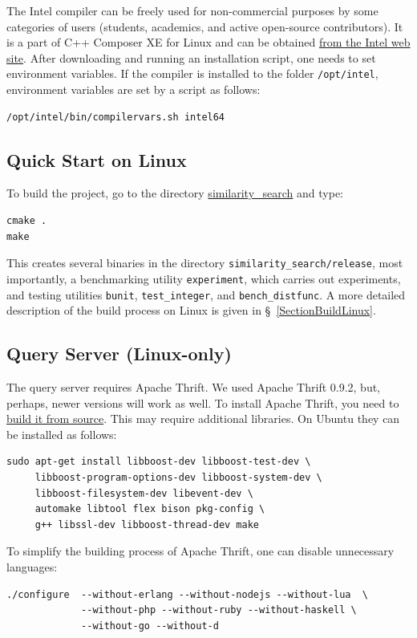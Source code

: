\documentclass[runningheads,a4paper]{llncs}
\newcommand{\replocdir}{https://github.com/searchivarius/nmslib/tree/v1.5/}
\newcommand{\ttt}[1]{\texttt{#1}}
\begin{document}
{The Intel compiler can be freely used for non-commercial purposes by some categories of users (students, academics,
and active open-source contributors).
It is a part of C++ Composer XE for Linux and can 
be obtained \href{http://software.intel.com/en-us/non-commercial-software-development}{from the Intel web site}.
After downloading and running an installation script, one needs to set environment variables.
If the compiler is installed to the folder \ttt{/opt/intel}, environment variables
are set by a script as follows:
\begin{verbatim}
/opt/intel/bin/compilervars.sh intel64
\end{verbatim}



\subsection{Quick Start on Linux}\label{QuickStartLinux}
To build the project, go to the directory \href{\replocdir similarity_search}{similarity\_search} and type:  
\begin{verbatim}
cmake .  
make   
\end{verbatim}
This creates several binaries in the directory \ttt{similarity\_search/release}, 
most importantly, 
a benchmarking utility \ttt{experiment}, which carries out experiments,
and testing utilities \ttt{bunit}, \ttt{test\_integer}, and \ttt{bench\_distfunc}.
A more detailed description of the build process on Linux is given in \S~\ref{SectionBuildLinux}.

\subsection{Query Server (Linux-only)}\label{SectionQueryServer}

The query server requires Apache Thrift. We used Apache Thrift 0.9.2, but, perhaps, newer versions will work as well.  
To install Apache Thrift, you need to \href{https://thrift.apache.org/docs/BuildingFromSource}{build it from source}.
This may require additional libraries. On Ubuntu they can be installed as follows:
\begin{verbatim}
sudo apt-get install libboost-dev libboost-test-dev \ 
     libboost-program-options-dev libboost-system-dev \
     libboost-filesystem-dev libevent-dev \
     automake libtool flex bison pkg-config \
     g++ libssl-dev libboost-thread-dev make
\end{verbatim}
To simplify the building process of Apache Thrift, one can disable unnecessary languages:
\begin{verbatim}
./configure  --without-erlang --without-nodejs --without-lua  \
             --without-php --without-ruby --without-haskell \
             --without-go --without-d 
\end{verbatim}

}
\end{document}
